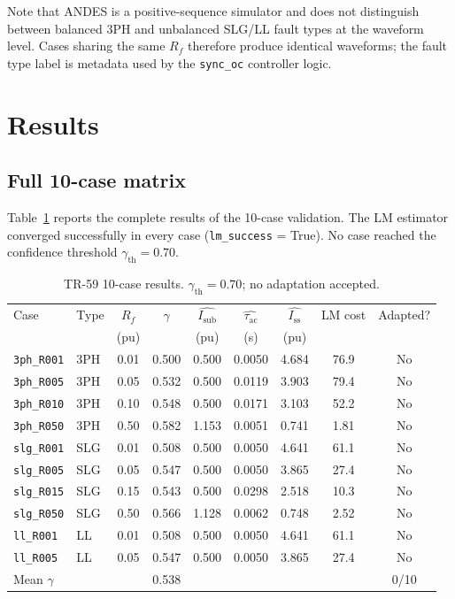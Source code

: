\documentclass[11pt,a4paper]{article}
\newcommand{\Isub}{I_{\text{sub}}}
\newcommand{\Iss}{I_{\text{ss}}}
\newcommand{\tauac}{\tau_{\text{ac}}}
\newcommand{\gconf}{\gamma}
\newcommand{\gth}{\gamma_{\text{th}}}
\begin{document}
\noindent
Note that ANDES is a positive-sequence simulator and does not distinguish
between balanced 3PH and unbalanced SLG/LL fault types at the waveform level.
Cases sharing the same $R_f$ therefore produce identical waveforms; the fault
type label is metadata used by the \texttt{sync\_oc} controller logic.

\section{Results}
\label{sec:results}

\subsection{Full 10-case matrix}

Table~\ref{tab:results} reports the complete results of the 10-case validation.
The LM estimator converged successfully in every case (\texttt{lm\_success}
= True).  No case reached the confidence threshold $\gth = 0.70$.

\begin{table}[ht]
  \centering
  \caption{TR-59 10-case results. $\gth = 0.70$; no adaptation accepted.}
  \label{tab:results}
  \begin{tabular}{llccccccc}
    \toprule
    Case & Type & $R_f$ & $\gconf$ & $\hat{\Isub}$ & $\hat{\tauac}$
         & $\hat{\Iss}$ & LM cost & Adapted? \\
         &      & (pu)  &          & (pu)          & (s)
         &  (pu)        &         &          \\
    \midrule
    \texttt{3ph\_R001} & 3PH & 0.01 & 0.500 & 0.500 & 0.0050 & 4.684 & 76.9 & No \\
    \texttt{3ph\_R005} & 3PH & 0.05 & 0.532 & 0.500 & 0.0119 & 3.903 & 79.4 & No \\
    \texttt{3ph\_R010} & 3PH & 0.10 & 0.548 & 0.500 & 0.0171 & 3.103 & 52.2 & No \\
    \texttt{3ph\_R050} & 3PH & 0.50 & 0.582 & 1.153 & 0.0051 & 0.741 & 1.81 & No \\
    \texttt{slg\_R001} & SLG & 0.01 & 0.508 & 0.500 & 0.0050 & 4.641 & 61.1 & No \\
    \texttt{slg\_R005} & SLG & 0.05 & 0.547 & 0.500 & 0.0050 & 3.865 & 27.4 & No \\
    \texttt{slg\_R015} & SLG & 0.15 & 0.543 & 0.500 & 0.0298 & 2.518 & 10.3 & No \\
    \texttt{slg\_R050} & SLG & 0.50 & 0.566 & 1.128 & 0.0062 & 0.748 & 2.52 & No \\
    \texttt{ll\_R001}  & LL  & 0.01 & 0.508 & 0.500 & 0.0050 & 4.641 & 61.1 & No \\
    \texttt{ll\_R005}  & LL  & 0.05 & 0.547 & 0.500 & 0.0050 & 3.865 & 27.4 & No \\
    \midrule
    \multicolumn{3}{l}{Mean $\gconf$} & 0.538 & & & & & 0/10 \\
    \bottomrule
  \end{tabular}
\end{table}
\end{document}

